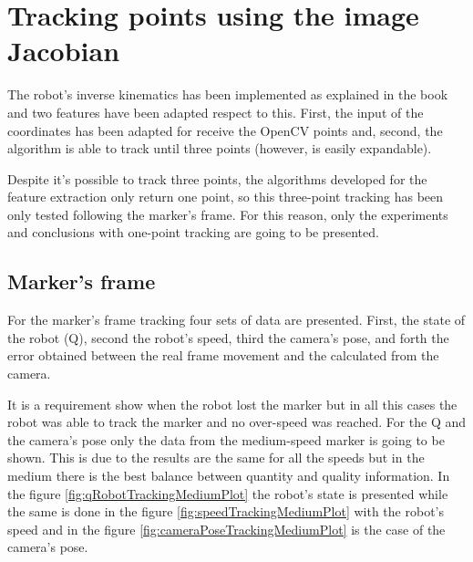 %





\chapter{Tracking points using the image Jacobian} %
\label{chap:tracking_points_using_the_image_jacobian}
The robot's inverse kinematics has been implemented as explained in the book and two features have been adapted respect to this. 
First, the input of the coordinates has been adapted for receive the OpenCV points and, second, the algorithm is able to track until three points (however, is easily expandable).

Despite it's possible to track three points, the algorithms developed for the feature extraction only return one point, so this three-point tracking has been only tested following the marker's frame. 
For this reason, only the experiments and conclusions with one-point tracking are going to be presented.


\section{Marker's frame} %
\label{sec:marker_s_frame}
	For the marker's frame tracking four sets of data are presented. 
	First, the state of the robot (Q), second the robot's speed, third the camera's pose, and forth the error obtained between the real frame movement and the calculated from the camera.

	It is a requirement show when the robot lost the marker but in all this cases the robot was able to track the marker and no over-speed was reached. 
	For the Q and the camera's pose only the data from the medium-speed marker is going to be shown. 
	This is due to the results are the same for all the speeds but in the medium there is the best balance between quantity and quality information.
	In the figure \ref{fig:qRobotTrackingMediumPlot} the robot's state is presented while the same is done in the figure \ref{fig:speedTrackingMediumPlot} with the robot's speed and in the figure \ref{fig:cameraPoseTrackingMediumPlot} is the case of the camera's pose.

		\ifx \plots \yes
			\qRobotTrackingMediumPlot
		\fi
		\ifx \plots \yes
			\speedTrackingMediumPlot
		\fi
		\ifx \plots \yes
			\cameraPoseTrackingMediumPlot
		\fi

